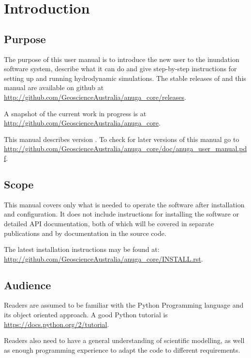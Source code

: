 \documentclass{manual}
\begin{document}

\chapter{Introduction}


\section{Purpose}

The purpose of this user manual is to introduce the new user to the
inundation software system, describe what it can do and give step-by-step
instructions for setting up and running hydrodynamic simulations.
The stable releases of \anuga and this manual are available on github at
\url{http://github.com/GeoscienceAustralia/anuga_core/releases}.

A snapshot of the current work in progress is at
\url{http://github.com/GeoscienceAustralia/anuga_core}.

This manual describes \anuga version \version. To check for later versions of this manual
go to \url{http://github.com/GeoscienceAustralia/anuga_core/doc/anuga_user_manual.pdf}.

\section{Scope}

This manual covers only what is needed to operate the software after
installation and configuration. It does not include instructions
for installing the software or detailed API documentation, both of
which will be covered in separate publications and by documentation
in the source code.

The latest installation instructions may be found at:
\url{http://github.com/GeoscienceAustralia/anuga_core/INSTALL.rst}.

\section{Audience}

Readers are assumed to be familiar with the Python Programming language and
its object oriented approach.
A good Python tutorial is
\url{https://docs.python.org/2/tutorial}.

Readers also need to have a general understanding of scientific modelling,
as well as enough programming experience to adapt the code to different
requirements.
\end{document}
